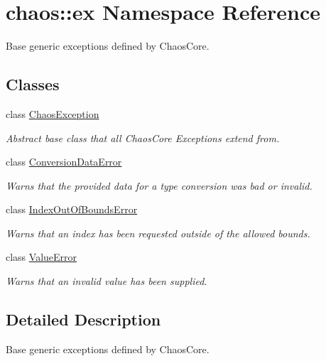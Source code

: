 \hypertarget{namespacechaos_1_1ex}{}\section{chaos\+:\+:ex Namespace Reference}
\label{namespacechaos_1_1ex}


Base generic exceptions defined by Chaos\+Core.  


\subsection*{Classes}
\begin{DoxyCompactItemize}
\item 
class \hyperlink{classchaos_1_1ex_1_1_chaos_exception}{Chaos\+Exception}
\begin{DoxyCompactList}\small\item\em Abstract base class that all Chaos\+Core Exceptions extend from. \end{DoxyCompactList}\item 
class \hyperlink{classchaos_1_1ex_1_1_conversion_data_error}{Conversion\+Data\+Error}
\begin{DoxyCompactList}\small\item\em Warns that the provided data for a type conversion was bad or invalid. \end{DoxyCompactList}\item 
class \hyperlink{classchaos_1_1ex_1_1_index_out_of_bounds_error}{Index\+Out\+Of\+Bounds\+Error}
\begin{DoxyCompactList}\small\item\em Warns that an index has been requested outside of the allowed bounds. \end{DoxyCompactList}\item 
class \hyperlink{classchaos_1_1ex_1_1_value_error}{Value\+Error}
\begin{DoxyCompactList}\small\item\em Warns that an invalid value has been supplied. \end{DoxyCompactList}\end{DoxyCompactItemize}


\subsection{Detailed Description}
Base generic exceptions defined by Chaos\+Core. 